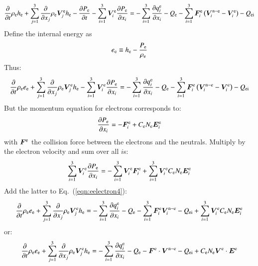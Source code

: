 \documentclass{warpdoc}
\renewcommand{\vec}[1]{\bm{#1}}
\begin{document}
%
\begin{equation}
 \frac{\partial }{\partial t}\rho_{\rm e} h_{\rm e} + \sum_{j=1}^3  \frac{\partial }{\partial x_j} \rho_{\rm e} \vec{V}^{\rm e}_j h_{\rm e} 
- \frac{\partial P_{\rm e}}{\partial t} - \sum_{i=1}^3 \vec{V}^{\rm e}_i \frac{\partial P_{\rm e}}{\partial x_i}
= 
-\sum_{i=1}^{3}\frac{\partial q_i^{\rm e}}{\partial x_i}
-Q_{{\rm e}}
-\sum_{i=1}^3 \vec{F}_i^{\rm e} \left( \vec{V}_i^{{\rm n}-{\rm e}}-\vec{V}_i^{\rm e} \right)
- Q_{\rm ei}
\end{equation}
%  
Define the internal energy as
%
\begin{equation}
e_{\rm e} \equiv h_{\rm e}-\frac{P_{\rm e}}{\rho_{\rm e}}
\end{equation}
%
Thus:
%
\begin{equation}
 \frac{\partial }{\partial t}\rho_{\rm e} e_{\rm e} + \sum_{j=1}^3  \frac{\partial }{\partial x_j} \rho_{\rm e} \vec{V}^{\rm e}_j h_{\rm e} 
- \sum_{i=1}^3 \vec{V}^{\rm e}_i \frac{\partial P_{\rm e}}{\partial x_i}
= 
-\sum_{i=1}^{3}\frac{\partial q_i^{\rm e}}{\partial x_i}
- Q_{{\rm e}}
-\sum_{i=1}^3 \vec{F}_i^{\rm e} \left( \vec{V}_i^{{\rm n}-{\rm e}}-\vec{V}_i^{\rm e} \right)
- Q_{\rm ei}
\label{eqn:eelectron4}
\end{equation}
%  
But the momentum equation for electrons corresponds to:
%
\begin{equation}
  \frac{\partial P_{\rm e}}{\partial x_i} = -\vec{F}_i^{\rm e} + C_{\rm e} N_{\rm e} \vec{E}^{\rm e}_i
\end{equation}
%
with $\vec{F}^{\rm e}$ the collision force between the electrons and the neutrals. Multiply by the electron velocity and sum over all $i$s:
%
\begin{equation}
  \sum_{i=1}^3 \vec{V}_i^{\rm e} \frac{\partial P_{\rm e}}{\partial x_i} = -\sum_{i=1}^3 \vec{V}_i^{\rm e} \vec{F}_i^{\rm e} + \sum_{i=1}^3 \vec{V}_i^{\rm e} C_{\rm e} N_{\rm e} \vec{E}^{\rm e}_i
\end{equation}
%
Add the latter to Eq.\ (\ref{eqn:eelectron4}):
%
\begin{equation}
 \frac{\partial }{\partial t}\rho_{\rm e} e_{\rm e} + \sum_{j=1}^3  \frac{\partial }{\partial x_j} \rho_{\rm e} \vec{V}^{\rm e}_j h_{\rm e} 
= 
-\sum_{i=1}^{3}\frac{\partial q_i^{\rm e}}{\partial x_i}
- Q_{{\rm e}}
-\sum_{i=1}^3 \vec{F}_i^{\rm e}  \vec{V}_i^{{\rm n}-{\rm e}} 
- Q_{\rm ei}
+ \sum_{i=1}^3 \vec{V}_i^{\rm e} C_{\rm e} N_{\rm e} \vec{E}^{\rm e}_i
\end{equation}
%  
or:
%
\begin{equation}
 \frac{\partial }{\partial t}\rho_{\rm e} e_{\rm e} + \sum_{j=1}^3  \frac{\partial }{\partial x_j} \rho_{\rm e} \vec{V}^{\rm e}_j h_{\rm e} 
= 
-\sum_{i=1}^{3}\frac{\partial q_i^{\rm e}}{\partial x_i}
- Q_{{\rm e}}
- \vec{F}^{\rm e}\cdot  \vec{V}^{{\rm n}-{\rm e}} 
- Q_{\rm ei}
+   C_{\rm e} N_{\rm e} \vec{V}^{\rm e} \cdot \vec{E}^{\rm e}
\end{equation}
\end{document}

